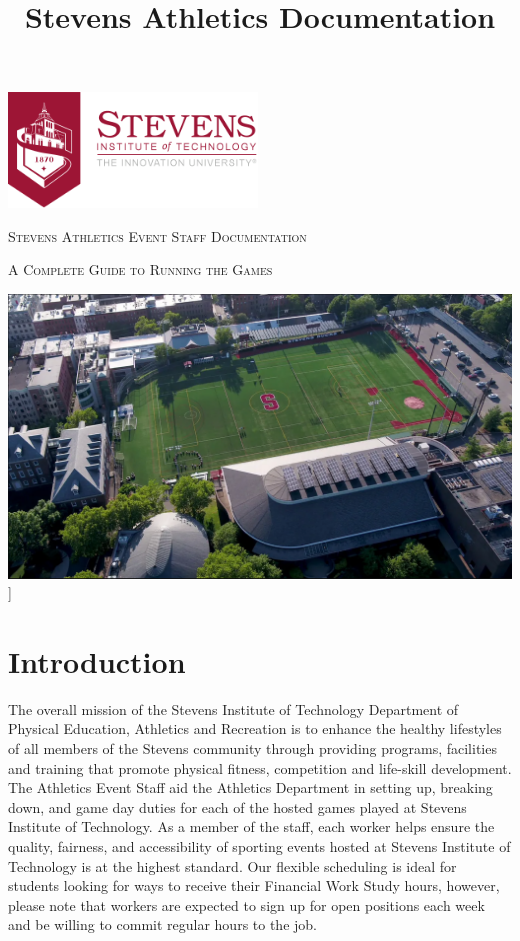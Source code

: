 \documentclass{article}
\begin{document}
\title{Stevens Athletics Documentation}
\begin{titlepage}

    \includegraphics[width = 250px]{images/stevensLogoChevron.png}
    \vspace{1.5cm}
    \begin{center}
	{\scshape\LARGE Stevens Athletics Event Staff Documentation\par}
	\vspace{0.5cm}
	{\scshape A Complete Guide to Running the Games \par}
    \vspace{1cm}
    \vfill
    \includegraphics[viewport=125 50 750 600]{images/field.png}]
    \end{center}
\end{titlepage}

\pagestyle{fancy}
\fancyhf{}
\renewcommand{\headrulewidth}{1pt}
\renewcommand{\footrulewidth}{1pt}

\section{Introduction}
The overall mission of the Stevens Institute of Technology Department of Physical Education, Athletics and Recreation is to enhance the healthy lifestyles of all members of the Stevens community through providing programs, facilities and training that promote physical fitness, competition and life-skill development. The Athletics Event Staff aid the Athletics Department in setting up, breaking down, and game day duties for each of the hosted games played at Stevens Institute of Technology. As a member of the staff, each worker helps ensure the quality, fairness, and accessibility of sporting events hosted at Stevens Institute of Technology is at the highest standard. Our flexible scheduling is ideal for students looking for ways to receive their Financial Work Study hours, however, please note that workers are expected to sign up for open positions each week and be willing to commit regular hours to the job. 
\end{document}
